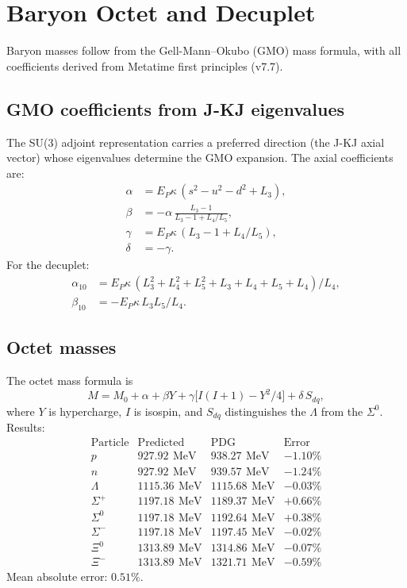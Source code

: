 \documentclass[aps,prd,reprint,twocolumn,showpacs,superscriptaddress]{revtex4-2}
\newcommand{\mev}{\,\text{MeV}}
\begin{document}
\section{Baryon Octet and Decuplet}
\label{sec:baryons}

Baryon masses follow from the Gell-Mann--Okubo (GMO) mass formula, with
all coefficients derived from Metatime first principles (v7.7).

\subsection{GMO coefficients from J-KJ eigenvalues}

The SU(3) adjoint representation carries a preferred direction
(the J-KJ axial vector) whose eigenvalues determine the GMO expansion.
The axial coefficients are:
\begin{align}
\alpha &= E_P\kappa\,(s^2 - u^2 - d^2 + L_3), \\
\beta &= -\alpha\,\frac{L_3 - 1}{L_3 - 1 + L_4/L_5}, \\
\gamma &= E_P\kappa\,(L_3 - 1 + L_4/L_5), \\
\delta &= -\gamma.
\end{align}
For the decuplet:
\begin{align}
\alpha_{10} &= E_P\kappa\,(L_3^2 + L_4^2 + L_5^2 + L_3 + L_4 + L_5 + L_4)/L_4, \\
\beta_{10} &= -E_P\kappa\,L_3 L_5 / L_4.
\end{align}

\subsection{Octet masses}

The octet mass formula is
\begin{equation}
M = M_0 + \alpha + \beta Y + \gamma\bigl[I(I+1) - Y^2/4\bigr] + \delta\,S_{dq},
\end{equation}
where $Y$ is hypercharge, $I$ is isospin, and $S_{dq}$ distinguishes
the $\Lambda$ from the $\Sigma^0$.  Results:
\[
\begin{array}{lccc}
\text{Particle} & \text{Predicted} & \text{PDG} & \text{Error} \\
p               & 927.92\ \mev   & 938.27\ \mev  & -1.10\% \\
n               & 927.92\ \mev   & 939.57\ \mev  & -1.24\% \\
\Lambda         & 1115.36\ \mev  & 1115.68\ \mev & -0.03\% \\
\Sigma^+        & 1197.18\ \mev  & 1189.37\ \mev & +0.66\% \\
\Sigma^0        & 1197.18\ \mev  & 1192.64\ \mev & +0.38\% \\
\Sigma^-        & 1197.18\ \mev  & 1197.45\ \mev & -0.02\% \\
\Xi^0           & 1313.89\ \mev  & 1314.86\ \mev & -0.07\% \\
\Xi^-           & 1313.89\ \mev  & 1321.71\ \mev & -0.59\%
\end{array}
\]
Mean absolute error: $0.51\%$.
\end{document}
